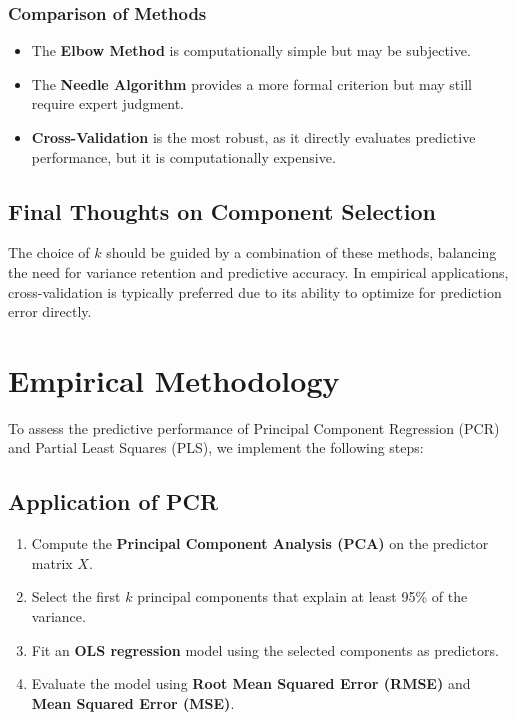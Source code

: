 \documentclass[11pt,twoside,a4paper]{article}
\begin{document}
\subsubsection{Comparison of Methods}
\begin{itemize}
    \item The \textbf{Elbow Method} is computationally simple but may be subjective.
    \item The \textbf{Needle Algorithm} provides a more formal criterion but may still require expert judgment.
    \item \textbf{Cross-Validation} is the most robust, as it directly evaluates predictive performance, but it is computationally expensive.
\end{itemize}

\subsection{Final Thoughts on Component Selection}
The choice of \( k \) should be guided by a combination of these methods, balancing the need for variance retention and predictive accuracy. In empirical applications, cross-validation is typically preferred due to its ability to optimize for prediction error directly.

\section{Empirical Methodology}

To assess the predictive performance of Principal Component Regression (PCR) and Partial Least Squares (PLS), we implement the following steps:

\subsection{Application of PCR}
\begin{enumerate}
    \item Compute the \textbf{Principal Component Analysis (PCA)} on the predictor matrix \(X\).
    \item Select the first \(k\) principal components that explain at least 95\% of the variance.
    \item Fit an \textbf{OLS regression} model using the selected components as predictors.
    \item Evaluate the model using \textbf{Root Mean Squared Error (RMSE)} and \textbf{Mean Squared Error (MSE)}.
\end{enumerate}
\end{document}
